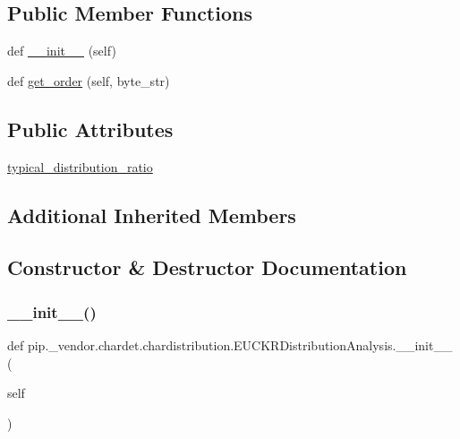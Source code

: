 \subsection*{Public Member Functions}
\begin{DoxyCompactItemize}
\item 
def \hyperlink{classpip_1_1__vendor_1_1chardet_1_1chardistribution_1_1EUCKRDistributionAnalysis_afa749ff8c0cd6467d188a4a97cd93bfd}{\+\_\+\+\_\+init\+\_\+\+\_\+} (self)
\item 
def \hyperlink{classpip_1_1__vendor_1_1chardet_1_1chardistribution_1_1EUCKRDistributionAnalysis_abd6afc26f82d4e971fef2332084ae775}{get\+\_\+order} (self, byte\+\_\+str)
\end{DoxyCompactItemize}
\subsection*{Public Attributes}
\begin{DoxyCompactItemize}
\item 
\hyperlink{classpip_1_1__vendor_1_1chardet_1_1chardistribution_1_1EUCKRDistributionAnalysis_a51c8ad9a36969a4405645eacfc7f4b6b}{typical\+\_\+distribution\+\_\+ratio}
\end{DoxyCompactItemize}
\subsection*{Additional Inherited Members}


\subsection{Constructor \& Destructor Documentation}
\mbox{\label{classpip_1_1__vendor_1_1chardet_1_1chardistribution_1_1EUCKRDistributionAnalysis_afa749ff8c0cd6467d188a4a97cd93bfd}} 
\subsubsection{\texorpdfstring{\+\_\+\+\_\+init\+\_\+\+\_\+()}{\_\_init\_\_()}}
{\footnotesize\ttfamily def pip.\+\_\+vendor.\+chardet.\+chardistribution.\+E\+U\+C\+K\+R\+Distribution\+Analysis.\+\_\+\+\_\+init\+\_\+\+\_\+ (\begin{DoxyParamCaption}\item[{}]{self }\end{DoxyParamCaption})}




